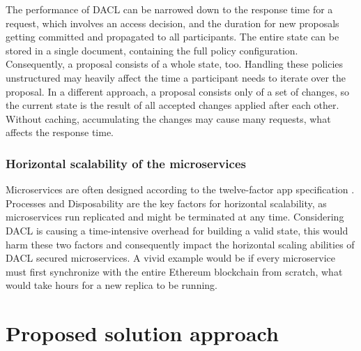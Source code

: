 \documentclass[12pt, conference]{IEEEtran}
\begin{document}
The performance of DACL can be narrowed down to the response time for a request, which involves an access decision, and the duration for new proposals getting committed and propagated to all participants. The entire state can be stored in a single document, containing the full policy configuration. Consequently, a proposal consists of a whole state, too. Handling these policies unstructured may heavily affect the time a participant needs to iterate over the proposal. In a different approach, a proposal consists only of a set of changes, so the current state is the result of all accepted changes applied after each other. Without caching, accumulating the changes may cause many requests, what affects the response time.


\subsubsection{Horizontal scalability of the microservices}

Microservices are often designed according to the twelve-factor app specification \cite{site1}. Processes and Disposability are the key factors for horizontal scalability, as microservices run replicated and might be terminated at any time. Considering DACL is causing a time-intensive overhead for building a valid state, this would harm these two factors and consequently impact the horizontal scaling abilities of DACL secured microservices. A vivid example would be if every microservice must first synchronize with the entire Ethereum blockchain from scratch, what would take hours for a new replica to be running.



\section{Proposed solution approach}
\end{document}
